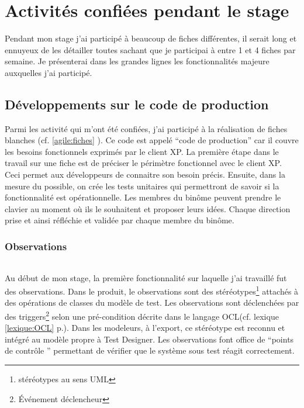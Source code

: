 \chapter{Activités confiées pendant le stage}
Pendant mon stage j'ai participé à beaucoup de fiches différentes, il serait long et ennuyeux de les détailler toutes sachant que je participai à entre 1 et 4 fiches par semaine. Je présenterai dans les grandes lignes les fonctionnalités majeure auxquelles j'ai participé. 

\section{Développements sur le code de production}
Parmi les activité qui m'ont été confiées, j'ai participé à la réalisation de fiches blanches (cf. \ref{agile:fiches} \pageref{agile:fiches}). Ce code est appelé ``code de production'' car il couvre les besoins fonctionnels exprimés par le client XP. La première étape dans le travail sur une fiche est de préciser le périmètre fonctionnel avec le client XP. Ceci permet aux développeurs de connaitre son besoin précis. Ensuite, dans la mesure du possible, on crée les tests unitaires qui permettront de savoir si la fonctionnalité est opérationnelle. Les membres du binôme peuvent prendre le clavier au moment où ils le souhaitent et proposer leurs idées. Chaque direction prise et ainsi réfléchie et validée par chaque membre du binôme.

\subsection{Observations}

\subparagraph*{}
Au début de mon stage, la première fonctionnalité sur laquelle j'ai travaillé fut des observations. Dans le produit, le observations sont des stéréotypes\footnote{stéréotypes au sens UML} attachés à des opérations de classes du modèle de test. Les observations sont déclenchées par des triggers\footnote{Événement déclencheur} selon une pré-condition décrite dans le langage OCL(cf. lexique \ref{lexique:OCL} p.\pageref{lexique:OCL}). Dans les modeleurs, à l'export, ce stéréotype est reconnu et intégré au modèle propre à Test Designer. Les observations font office de ``points de contrôle '' permettant de vérifier que le système sous test réagit correctement.

